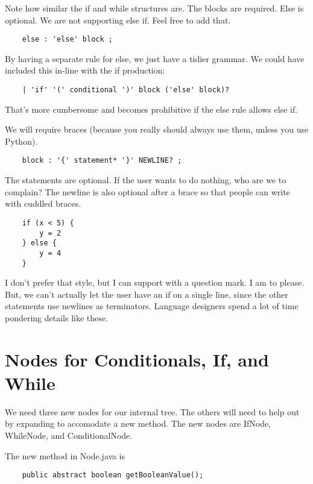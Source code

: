 Note how similar the if and while structures are. The blocks are required. Else
is optional. We are not supporting else if. Feel free to add that.

{\footnotesize
\begin{verbatim}
    else : 'else' block ;
\end{verbatim}
}

By having a separate rule for else, we just have a tidier grammar. We could have
included this in-line with the if production:

{\footnotesize
\begin{verbatim}
    | 'if' '(' conditional ')' block ('else' block)?
\end{verbatim}
}

That's more cumbersome and becomes prohibitive if the else rule allows else if.

We will require braces (because you really should always use them, unless you
use Python).

{\footnotesize
\begin{verbatim}
    block : '{' statement* '}' NEWLINE? ;
\end{verbatim}
}

The statements are optional. If the user wants to do nothing, who are we to complain?
The newline is also optional after a brace so that people can write with cuddled braces.

{\footnotesize
\begin{verbatim}
    if (x < 5) {
        y = 2
    } else {
        y = 4
    }
\end{verbatim}
}

I don't prefer that style, but I can support with a question mark. I am to please.
But, we can't actually let the user have an if on a single line, since the other
statements use newlines as terminators. Language designers spend a lot of time
pondering details like these.

\section{Nodes for Conditionals, If, and While}

We need three new nodes for our internal tree. The others will need to help out
by expanding to accomodate a new method. The new nodes are IfNode, WhileNode,
and ConditionalNode.

The new method in Node.java is

{\footnotesize
\begin{verbatim}
    public abstract boolean getBooleanValue();
\end{verbatim}
}

